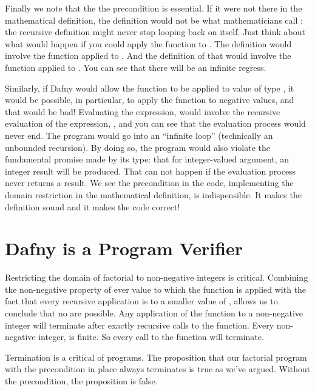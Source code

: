 \documentclass[letterpaper,10pt,english]{sphinxmanual}
\begin{document}
Finally we note that the the precondition is essential. If it were not
there in the mathematical definition, the definition would not be what
mathematicians call : the recursive definition might
never stop looping back on itself. Just think about what would happen
if you could apply the function to . The definition would involve
the function applied to . And the definition of that would involve
the function applied to . You can see that there will be an
infinite regress.

Similarly, if Dafny would allow the function to be applied to 
value of type , it would be possible, in particular, to apply the
function to negative values, and that would be bad!  Evaluating the
expression,  would involve the recursive evaluation of
the expression, , and you can see that the evaluation
process would never end. The program would go into an “infinite loop”
(technically an unbounded recursion). By doing so, the program would
also violate the fundamental promise made by its type: that for 
integer-valued argument, an integer result will be produced. That can
not happen if the evaluation process never returns a result. We see
the precondition in the code, implementing the domain restriction in
the mathematical definition, is indispensible. It makes the definition
sound and it makes the code correct!


\section{Dafny is a Program Verifier}
\label{\detokenize{04-runnable-math:dafny-is-a-program-verifier}}
Restricting the domain of factorial to non-negative integers is
critical. Combining the non-negative property of ever value to which
the function is applied with the fact that every recursive application
is to a smaller value of , allows us to conclude that no  are possible. Any application of the function to a
non-negative integer  will terminate after exactly  recursive
calls to the function. Every non-negative integer,  is finite. So
every call to the function will terminate.

Termination is a critical  of programs. The proposition that
our factorial program with the precondition in place always terminates
is true as we’ve argued. Without the precondition, the proposition is
false.
\end{document}
